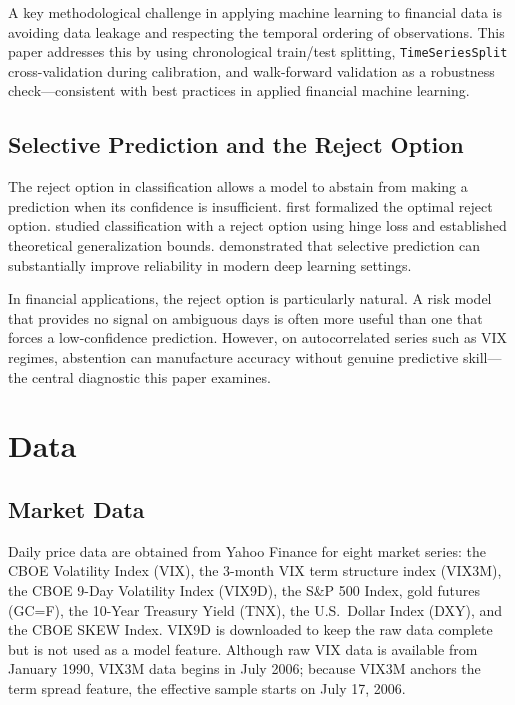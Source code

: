 \documentclass[12pt]{article}
\begin{document}
A key methodological challenge in applying machine learning to financial data is avoiding data
leakage and respecting the temporal ordering of observations. This paper addresses this by using
chronological train/test splitting, \texttt{TimeSeriesSplit} cross-validation during calibration,
and walk-forward validation as a robustness check---consistent with best practices in applied
financial machine learning.

\subsection{Selective Prediction and the Reject Option}

The reject option in classification allows a model to abstain from making a prediction when its
confidence is insufficient. \citet{chow1970} first formalized the optimal reject option.
\citet{bartlett2008} studied classification with a reject option using hinge loss and established
theoretical generalization bounds. \citet{geifman2017} demonstrated that selective prediction
can substantially improve reliability in modern deep learning settings.

In financial applications, the reject option is particularly natural. A risk model that provides
no signal on ambiguous days is often more useful than one that forces a low-confidence prediction.
However, on autocorrelated series such as VIX regimes, abstention can manufacture accuracy without
genuine predictive skill---the central diagnostic this paper examines.

\section{Data}
\label{sec:data}

\subsection{Market Data}

Daily price data are obtained from Yahoo Finance for eight market series: the CBOE Volatility
Index (VIX), the 3-month VIX term structure index (VIX3M), the CBOE 9-Day Volatility Index
(VIX9D), the S\&P 500 Index, gold futures (GC=F), the 10-Year Treasury Yield (TNX), the U.S.\
Dollar Index (DXY), and the CBOE SKEW Index. VIX9D is downloaded to keep the raw data complete
but is not used as a model feature. Although raw VIX data is available from January 1990, VIX3M
data begins in July 2006; because VIX3M anchors the term spread feature, the effective sample
starts on July 17, 2006.
\end{document}
